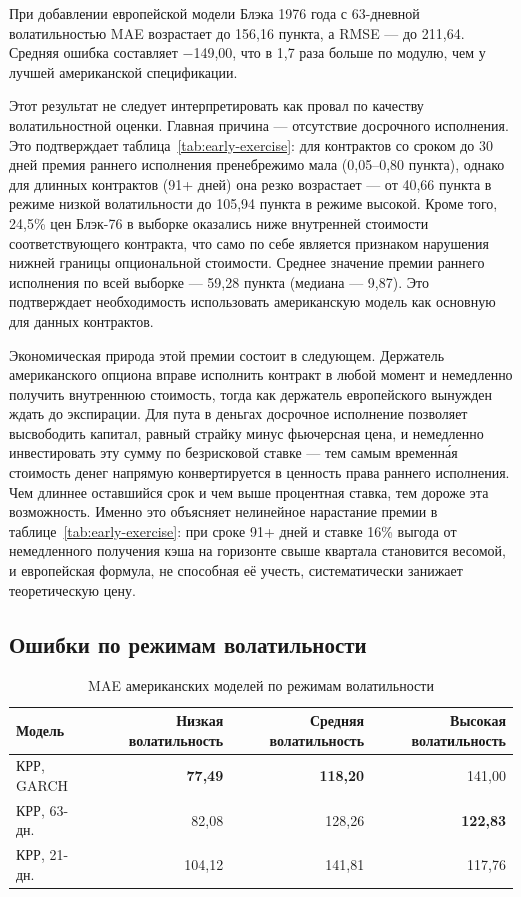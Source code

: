 \documentclass[11pt,a4paper]{article}
\begin{document}
При добавлении европейской модели Блэка 1976 года с 63-дневной волатильностью MAE возрастает до 156,16 пункта, а RMSE --- до 211,64. Средняя ошибка составляет $-$149,00, что в 1,7 раза больше по модулю, чем у лучшей американской спецификации.

Этот результат не следует интерпретировать как провал по качеству волатильностной оценки. Главная причина --- отсутствие досрочного исполнения. Это подтверждает таблица~\ref{tab:early-exercise}: для контрактов со сроком до 30 дней премия раннего исполнения пренебрежимо мала (0,05--0,80 пункта), однако для длинных контрактов (91+ дней) она резко возрастает --- от 40,66 пункта в режиме низкой волатильности до 105,94 пункта в режиме высокой. Кроме того, 24,5\% цен Блэк-76 в выборке оказались ниже внутренней стоимости соответствующего контракта, что само по себе является признаком нарушения нижней границы опциональной стоимости. Среднее значение премии раннего исполнения по всей выборке --- 59,28 пункта (медиана --- 9,87). Это подтверждает необходимость использовать американскую модель как основную для данных контрактов.

Экономическая природа этой премии состоит в следующем. Держатель американского опциона вправе исполнить контракт в любой момент и немедленно получить внутреннюю стоимость, тогда как держатель европейского вынужден ждать до экспирации. Для пута в деньгах досрочное исполнение позволяет высвободить капитал, равный страйку минус фьючерсная цена, и немедленно инвестировать эту сумму по безрисковой ставке --- тем самым временна́я стоимость денег напрямую конвертируется в ценность права раннего исполнения. Чем длиннее оставшийся срок и чем выше процентная ставка, тем дороже эта возможность. Именно это объясняет нелинейное нарастание премии в таблице~\ref{tab:early-exercise}: при сроке 91+ дней и ставке 16\% выгода от немедленного получения кэша на горизонте свыше квартала становится весомой, и европейская формула, не способная её учесть, систематически занижает теоретическую цену.

\subsection{Ошибки по режимам волатильности}

\begin{table}[H]
\centering
\caption{MAE американских моделей по режимам волатильности}
\label{tab:mae-regime}
\small
\begin{tabular}{lrrr}
\toprule
Модель & Низкая волатильность & Средняя волатильность & Высокая волатильность \\
\midrule
КРР, GARCH    & \textbf{77,49} & \textbf{118,20} & 141,00 \\
КРР, 63-дн.   & 82,08          & 128,26          & \textbf{122,83} \\
КРР, 21-дн.   & 104,12         & 141,81          & 117,76 \\
\bottomrule
\end{tabular}
\end{table}
\end{document}
